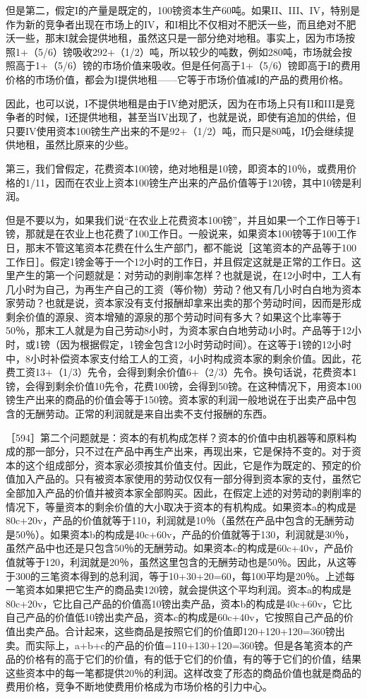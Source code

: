 但是第二，假定I的产量是既定的，100镑资本生产60吨。如果II、III、IV，特别是作为新的竞争者出现在市场上的IV，和I相比不仅相对不肥沃一些，而且绝对不肥沃一些，那末I就会提供地租，虽然这只是一部分绝对地租。事实上，因为市场按照1+（5/6）镑吸收292+（1/2）吨，所以较少的吨数，例如280吨，市场就会按照高于1+（5/6）镑的市场价值来吸收。但是任何高于1+（5/6）镑即高于I的费用价格的市场价值，都会为I提供地租——它等于市场价值减I的产品的费用价格。

因此，也可以说，I不提供地租是由于IV绝对肥沃，因为在市场上只有II和III是竞争者的时候，I还提供地租，甚至当IV出现了，也就是说，即使有追加的供给，但只要IV使用资本100镑生产出来的不是92+（1/2）吨，而只是80吨，I仍会继续提供地租，虽然比原来的少些。

第三，我们曾假定，花费资本100镑，绝对地租是10镑，即资本的10％，或费用价格的1/11，因而在农业上资本100镑生产出来的产品价值等于120镑，其中10镑是利润。

但是不要以为，如果我们说“在农业上花费资本100镑”，并且如果一个工作日等于1镑，那就是在农业上也花费了100工作日。一般说来，如果资本100镑等于100工作日，那末不管这笔资本花费在什么生产部门，都不能说［这笔资本的产品等于100工作日］。假定1镑金等于一个12小时的工作日，并且假定这就是正常的工作日。这里产生的第一个问题就是：对劳动的剥削率怎样？也就是说，在12小时中，工人有几小时为自己，为再生产自己的工资（等价物）劳动？他又有几小时白白地为资本家劳动？也就是说，资本家没有支付报酬却拿来出卖的那个劳动时间，因而是形成剩余价值的源泉、资本增殖的源泉的那个劳动时间有多大？如果这个比率等于50％，那末工人就是为自己劳动8小时，为资本家白白地劳动4小时。产品等于12小时，或1镑（因为根据假定，1镑金包含12小时劳动时间）。在这等于1镑的12小时中，8小时补偿资本家支付给工人的工资，4小时构成资本家的剩余价值。因此，花费工资13+（1/3）先令，会得到剩余价值6+（2/3）先令。换句话说，花费资本1镑，会得到剩余价值10先令，花费100镑，会得到50镑。在这种情况下，用资本100镑生产出来的商品的价值会等于150镑。资本家的利润一般地说在于出卖产品中包含的无酬劳动。正常的利润就是来自出卖不支付报酬的东西。

［594］第二个问题就是：资本的有机构成怎样？资本的价值中由机器等和原料构成的那一部分，只不过在产品中再生产出来，再现出来，它是保持不变的。对于资本的这个组成部分，资本家必须按其价值支付。因此，它是作为既定的、预定的价值加入产品的。只有被资本家使用的劳动仅仅有一部分得到资本家的支付，虽然它全部加入产品的价值并被资本家全部购买。因此，在假定上述的对劳动的剥削率的情况下，等量资本的剩余价值的大小取决于资本的有机构成。如果资本a的构成是80c+20v，产品的价值就等于110，利润就是10％（虽然在产品中包含的无酬劳动是50％）。如果资本b的构成是40c+60v，产品的价值就等于130，利润就是30％，虽然产品中也还是只包含50％的无酬劳动。如果资本c的构成是60c+40v，产品价值就等于120，利润就是20％，虽然这里包含的无酬劳动也是50％。因此，从这等于300的三笔资本得到的总利润，等于10+30+20=60，每100平均是20％。上述每一笔资本如果把它生产的商品卖120镑，就会提供这个平均利润。资本a的构成是80c+20v，它比自己产品的价值高10镑出卖产品，资本b的构成是40c+60v，它比自己产品的价值低10镑出卖产品，资本c的构成是60c+40v，它按照自己产品的价值出卖产品。合计起来，这些商品是按照它们的价值即120+120+120=360镑出卖。而实际上，a+b+c的产品的价值=110+130+120=360镑。但是各笔资本的产品的价格有的高于它们的价值，有的低于它们的价值，有的等于它们的价值，结果这些资本中的每一笔都提供20％的利润。这样改变了形态的商品价值也就是商品的费用价格，竞争不断地使费用价格成为市场价格的引力中心。

